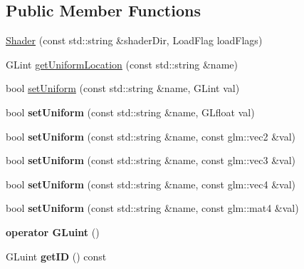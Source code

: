 \subsection*{Public Member Functions}
\begin{DoxyCompactItemize}
\item 
\hyperlink{class_shader_a4448038b6c1f3aa797685728618c761e}{Shader} (const std\+::string \&shader\+Dir, Load\+Flag load\+Flags)
\item 
G\+Lint \hyperlink{class_shader_a2708a72dd82b3123cb77f1f1dfbbce09}{get\+Uniform\+Location} (const std\+::string \&name)
\item 
bool \hyperlink{class_shader_a71a0f88dafffbb3c3f0829e7a8c77abc}{set\+Uniform} (const std\+::string \&name, G\+Lint val)
\item 
\hypertarget{class_shader_a92000cd568b0afffce9d3b71e3953ce7}{}bool {\bfseries set\+Uniform} (const std\+::string \&name, G\+Lfloat val)\label{class_shader_a92000cd568b0afffce9d3b71e3953ce7}

\item 
\hypertarget{class_shader_a05f2c0f13bad7ade5e89dc7349f0af26}{}bool {\bfseries set\+Uniform} (const std\+::string \&name, const glm\+::vec2 \&val)\label{class_shader_a05f2c0f13bad7ade5e89dc7349f0af26}

\item 
\hypertarget{class_shader_ae3f3704fec39edddd64945711df93eb6}{}bool {\bfseries set\+Uniform} (const std\+::string \&name, const glm\+::vec3 \&val)\label{class_shader_ae3f3704fec39edddd64945711df93eb6}

\item 
\hypertarget{class_shader_a14631fcf5837fadd0ab6646338d8f11d}{}bool {\bfseries set\+Uniform} (const std\+::string \&name, const glm\+::vec4 \&val)\label{class_shader_a14631fcf5837fadd0ab6646338d8f11d}

\item 
\hypertarget{class_shader_a6bb527eba6c723f351e9427ea404f92f}{}bool {\bfseries set\+Uniform} (const std\+::string \&name, const glm\+::mat4 \&val)\label{class_shader_a6bb527eba6c723f351e9427ea404f92f}

\item 
\hypertarget{class_shader_a5e7a1c2b5e9cb47ba8f3f546e4c21081}{}{\bfseries operator G\+Luint} ()\label{class_shader_a5e7a1c2b5e9cb47ba8f3f546e4c21081}

\item 
\hypertarget{class_shader_a3ef07768420e3b9459cbe8d781868c76}{}G\+Luint {\bfseries get\+I\+D} () const \label{class_shader_a3ef07768420e3b9459cbe8d781868c76}

\end{DoxyCompactItemize}


